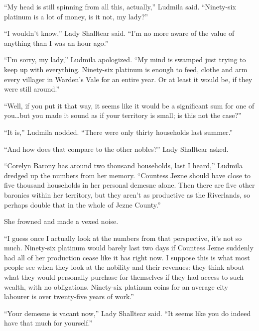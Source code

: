  

“My head is still spinning from all this, actually,” Ludmila said. “Ninety-six platinum is a lot of money, is it not, my lady?”

 

“I wouldn’t know,” Lady Shalltear said. “I’m no more aware of the value of anything than I was an hour ago.”

 

“I’m sorry, my lady,” Ludmila apologized. “My mind is swamped just trying to keep up with everything. Ninety-six platinum is enough to feed, clothe and arm every villager in Warden’s Vale for an entire year. Or at least it would be, if they were still around.”

 

“Well, if you put it that way, it seems like it would be a significant sum for one of you…but you made it sound as if your territory is small; is this not the case?”

 

“It is,” Ludmila nodded. “There were only thirty households last summer.”

 

“And how does that compare to the other nobles?” Lady Shalltear asked.

 

“Corelyn Barony has around two thousand households, last I heard,” Ludmila dredged up the numbers from her memory. “Countess Jezne should have close to five thousand households in her personal demesne alone. Then there are five other baronies within her territory, but they aren't as productive as the Riverlands, so perhaps double that in the whole of Jezne County.”

 

She frowned and made a vexed noise.

 

“I guess once I actually look at the numbers from that perspective, it’s not so much. Ninety-six platinum would barely last two days if Countess Jezne suddenly had all of her production cease like it has right now. I suppose this is what most people see when they look at the nobility and their revenues: they think about what they would personally purchase for themselves if they had access to such wealth, with no obligations. Ninety-six platinum coins for an average city labourer is over twenty-five years of work.”

 

“Your demesne is vacant now,” Lady Shalltear said. “It seems like you do indeed have that much for yourself.”

